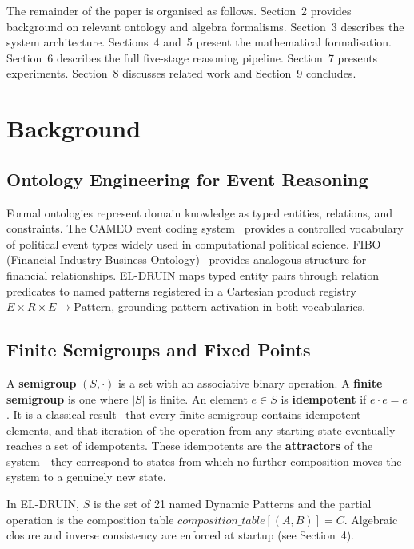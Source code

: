 \documentclass{llncs}
\begin{document}
The remainder of the paper is organised as follows. Section~2 provides
background on relevant ontology and algebra formalisms. Section~3
describes the system architecture. Sections~4 and~5 present the
mathematical formalisation. Section~6 describes the full five-stage
reasoning pipeline. Section~7 presents experiments. Section~8 discusses
related work and Section~9 concludes.

\section{Background}

\subsection{Ontology Engineering for Event Reasoning}

Formal ontologies represent domain knowledge as typed entities,
relations, and constraints. The CAMEO event coding system~\cite{schrodt2012cameo}
provides a controlled vocabulary of political event types widely used in
computational political science. FIBO (Financial Industry Business
Ontology)~\cite{fibo2023} provides analogous structure for financial relationships.
EL-DRUIN maps typed entity pairs through relation predicates to named
patterns registered in a Cartesian product registry
$E \times R \times E \to \mathrm{Pattern}$, grounding pattern activation in both vocabularies.

\subsection{Finite Semigroups and Fixed Points}

A \textbf{semigroup} $(S, \cdot)$ is a set with an associative binary operation.
A \textbf{finite semigroup} is one where $|S|$ is finite. An element $e \in S$
is \textbf{idempotent} if $e \cdot e = e$. It is a classical
result~\cite{green1951structure} that every finite semigroup contains idempotent
elements, and that iteration of the operation from any starting state
eventually reaches a set of idempotents. These idempotents are the
\textbf{attractors} of the system---they correspond to states from which no
further composition moves the system to a genuinely new state.

In EL-DRUIN, $S$ is the set of 21 named Dynamic Patterns and the partial
operation is the composition table $\mathit{composition\_table}[(A, B)] = C$.
Algebraic closure and inverse consistency are enforced at startup (see Section~4).
\end{document}
